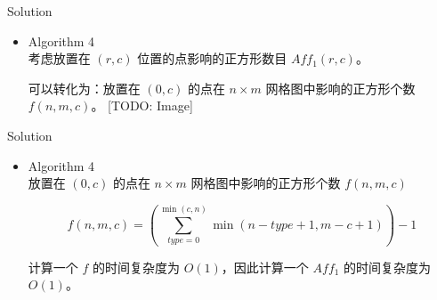 \documentclass[UTF8]{beamer}
\begin{document}
\begin{frame}{Solution}

\begin{itemize}
    \item Algorithm 4 \\
        考虑放置在 $(r, c)$ 位置的点影响的正方形数目 $Aff_1(r, c)$。

        \pause
        可以转化为：放置在 $(0, c)$ 的点在 $n \times m$ 网格图中影响的正方形个数 $f(n, m, c)$。
        [TODO: Image]

\end{itemize}

\end{frame}

\begin{frame}{Solution}

\begin{itemize}
    \item Algorithm 4 \\
        放置在 $(0, c)$ 的点在 $n \times m$ 网格图中影响的正方形个数 $f(n, m, c)$

        $$
            f(n, m, c) = (\sum_{type = 0}^{\min(c, n)} \min(n - type + 1, m - c + 1)) - 1
        $$

        计算一个 $f$ 的时间复杂度为 $O(1)$，因此计算一个 $Aff_1$ 的时间复杂度为 $O(1)$。
\end{itemize}

\end{frame}
\end{document}

